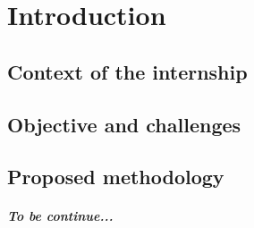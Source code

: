 
\graphicspath{ {1chapterIntroduction/image/} }
\chapter{Introduction}
\section{Context of the internship}
\section{Objective and challenges}
\section{Proposed methodology}
\paragraph{To be continue...}
